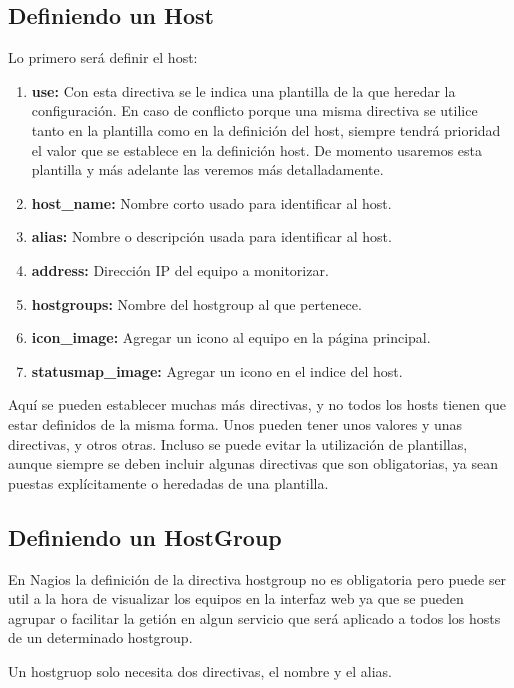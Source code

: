 \documentclass[12pt]{book}
\begin{document}
    \subsection{ Definiendo un Host }
    Lo primero será definir el host:
    \begin{alltt}
      
    \end{alltt}
    \begin{enumerate}
      \item {\bf use: } Con esta directiva se le indica una plantilla de la que heredar la configuración. En caso de
      conflicto porque una misma directiva se utilice tanto en la plantilla como en la definición del host,
      siempre tendrá prioridad el valor que se establece en la definición host. De momento usaremos esta
      plantilla y más adelante las veremos más detalladamente. 
      \item {\bf host\_name: }Nombre corto usado para identificar al host.
      \item {\bf alias: } Nombre o descripción usada para identificar al host.
  
      \item {\bf address: } Dirección IP del equipo a monitorizar.
  
      \item {\bf hostgroups: } Nombre del hostgroup al que pertenece. 
      \item {\bf icon\_image: } Agregar un icono al equipo en la página principal.
      \item {\bf statusmap\_image: } Agregar un icono en el indice del host.
    \end{enumerate}
    Aquí se pueden establecer muchas más directivas, y no todos los hosts tienen que estar definidos de la
    misma forma. Unos pueden tener unos valores y unas directivas, y otros otras. Incluso se puede evitar la
    utilización de plantillas, aunque siempre se deben incluir algunas directivas que son obligatorias, ya sean
    puestas explícitamente o heredadas de una plantilla. 
    \subsection{ Definiendo un HostGroup }
    En Nagios la definición de la directiva hostgroup no es obligatoria pero puede ser util a la hora de visualizar
    los equipos en la interfaz web ya que se pueden agrupar o facilitar la getión en algun servicio que será aplicado
    a todos los hosts de un determinado hostgroup.
    \vspace{-5mm}
    \begin{alltt}
      
    \end{alltt}
    \vspace{-5mm}
    Un hostgruop solo necesita dos directivas, el nombre y el alias.
\end{document}
